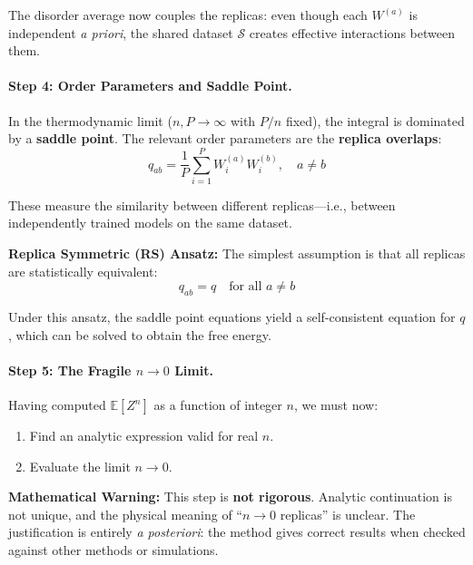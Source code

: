 \documentclass[
  journal=largetwo,
  simfonts=false,
  year=2025,
  volume=37,
]{cup-journal}
\begin{document}
The disorder average now couples the replicas: even though each $W^{(a)}$ is independent \textit{a priori}, the shared dataset $\mathcal{S}$ creates effective interactions between them.

\paragraph{Step 4: Order Parameters and Saddle Point.}

In the thermodynamic limit ($n, P \to \infty$ with $P/n$ fixed), the integral is dominated by a \textbf{saddle point}. The relevant order parameters are the \textbf{replica overlaps}:
\begin{equation}
    q_{ab} = \frac{1}{P} \sum_{i=1}^{P} W_i^{(a)} W_i^{(b)}, \quad a \neq b
\end{equation}

These measure the similarity between different replicas---i.e., between independently trained models on the same dataset.

\textbf{Replica Symmetric (RS) Ansatz:} The simplest assumption is that all replicas are statistically equivalent:
\begin{equation}
    q_{ab} = q \quad \text{for all } a \neq b
\end{equation}

Under this ansatz, the saddle point equations yield a self-consistent equation for $q$, which can be solved to obtain the free energy.

\paragraph{Step 5: The Fragile $n \to 0$ Limit.}

Having computed $\mathbb{E}[Z^n]$ as a function of integer $n$, we must now:
\begin{enumerate}
    \item Find an analytic expression valid for real $n$.
    \item Evaluate the limit $n \to 0$.
\end{enumerate}

\textbf{Mathematical Warning:} This step is \textbf{not rigorous}. Analytic continuation is not unique, and the physical meaning of ``$n \to 0$ replicas'' is unclear. The justification is entirely \textit{a posteriori}: the method gives correct results when checked against other methods or simulations.
\end{document}
